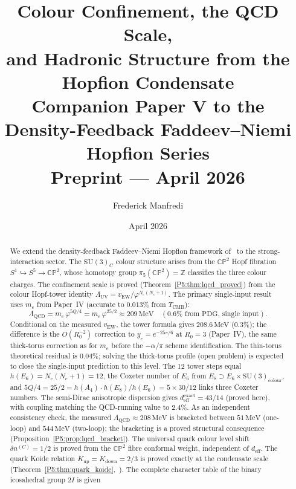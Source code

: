 \documentclass[11pt,a4paper]{article}
\title{\textbf{Colour Confinement, the QCD Scale,\\
and Hadronic Structure from the Hopfion Condensate}
\\[0.6em]
{\large Companion Paper V to the Density-Feedback
Faddeev--Niemi Hopfion Series}
\\[0.6em]
\large Preprint --- April 2026}
\author{Frederick Manfredi}
\date{April 2026}
\theoremstyle{definition}
\theoremstyle{remark}
\newcommand{\vp}{\varphi}
\newcommand{\TCMB}{T_{\mathrm{CMB}}}
\newcommand{\vEW}{v_{\mathrm{EW}}}
\newcommand{\LUV}{\Lambda_{\mathrm{UV}}}
\newcommand{\LQCD}{\Lambda_{\mathrm{QCD}}}
\newcommand{\deff}{d_{\mathrm{eff}}}
\begin{document}
\maketitle

\begin{abstract}
We extend the density-feedback Faddeev--Niemi Hopfion framework
of~\cite{Paper1,Paper2,Paper3,Paper4} to the strong-interaction sector.
The $\mathrm{SU}(3)_C$ colour structure arises from the $\mathbb{CP}^2$
Hopf fibration $S^1\hookrightarrow S^5\to\mathbb{CP}^2$, whose
homotopy group $\pi_5(\mathbb{CP}^2)=\mathbb{Z}$ classifies the three
colour charges.
The confinement scale is proved (Theorem~\ref{P5:thm:lqcd_proved}) from
the colour Hopf-tower identity $\LUV=\vEW/\vp^{N_c(N_c+1)}$.
The primary single-input result uses $m_e$ from Paper~IV (accurate to $0.013\%$ from $\TCMB$):
\begin{equation*}
  \LQCD = m_e\,\vp^{5Q/4} = m_e\,\vp^{25/2}
  \approx 209\,\mathrm{MeV}
  \quad(0.6\%\text{ from PDG, single input}).
\end{equation*}
Conditional on the measured $\vEW$, the tower formula gives $208.6\,\mathrm{MeV}$ ($0.3\%$);
the difference is the $O(R_0^{-2})$ correction to $y_e=e^{-25\pi/6}$ at $R_0=3$
(Paper~IV), the same thick-torus correction as for $m_e$ before the $-\alpha/\pi$
scheme identification.
The thin-torus theoretical residual is $0.04\%$; solving the thick-torus
profile (open problem) is expected to close the single-input prediction to this level.
The 12 tower steps equal $h(E_6)=N_c(N_c+1)=12$, the Coxeter number of
$E_6$ from $E_8\supset E_6\times\mathrm{SU}(3)_{\mathrm{colour}}$,
and $5Q/4=25/2=h(A_4)\cdot h(E_8)/h(E_6)=5\times30/12$ links three Coxeter numbers.
The semi-Dirac anisotropic dispersion gives $\deff^{\mathrm{exact}}=43/14$ (proved here),
with coupling matching the QCD-running value to $2.4\%$.
As an independent consistency check, the measured $\LQCD\approx208\,\mathrm{MeV}$
is bracketed between $51\,\mathrm{MeV}$ (one-loop) and $544\,\mathrm{MeV}$ (two-loop);
the bracketing is a proved structural consequence (Proposition~\ref{P5:prop:lqcd_bracket}).
The universal quark colour level shift $\delta n^{(C)}=1/2$ is proved from
the $\mathbb{CP}^2$ fibre conformal weight, independent of $\deff$.
The quark Koide relation $K_{\mathrm{up}}=K_{\mathrm{down}}=2/3$ is proved
exactly at the condensate scale (Theorem~\ref{P5:thm:quark_koide},~\cite{Koide1983}).
The complete character table of the binary icosahedral group $2I$ is given

\end{abstract}
\end{document}
